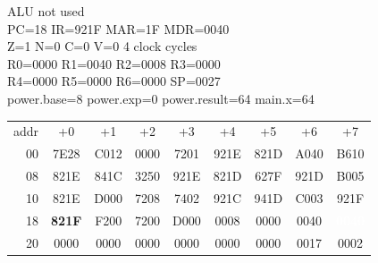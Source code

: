 \begin{tcolorbox}[stepbox, title={Step 37 \hfill PC 17 \quad ST R1, main.x}]
\textcolor{dim}{ALU} \textcolor{dim}{not used}\\
PC=18 IR=921F MAR=1F MDR=0040\\
Z=1 N=0 C=0 V=0 \hfill \textcolor{dim}{4 clock cycles}\\
R0=0000 R1=0040 R2=0008 R3=0000\\
R4=0000 R5=0000 R6=0000 SP=0027\\
\textcolor{dim}{power.base=8  power.exp=0  power.result=64  main.x=64}\\[1pt]
{\setlength{\tabcolsep}{1.6pt}\begin{tabular}{@{}r*{8}{c}@{}}
\textcolor{dim}{addr} & \textcolor{dim}{+0} & \textcolor{dim}{+1} & \textcolor{dim}{+2} & \textcolor{dim}{+3} & \textcolor{dim}{+4} & \textcolor{dim}{+5} & \textcolor{dim}{+6} & \textcolor{dim}{+7}\\
\textcolor{dim}{00} & 7E28 & C012 & 0000 & 7201 & 921E & 821D & A040 & B610\\
\textcolor{dim}{08} & 821E & 841C & 3250 & 921E & 821D & 627F & 921D & B005\\
\textcolor{dim}{10} & 821E & D000 & 7208 & 7402 & 921C & 941D & C003 & 921F\\
\textcolor{dim}{18} & \cellcolor{pcc}\textbf{821F} & F200 & 7200 & D000 & \cellcolor{datac}0008 & \cellcolor{datac}0000 & \cellcolor{datac}0040 & \cellcolor{wrt}\textcolor{white}{\textbf{0040}}\\
\textcolor{dim}{20} & \cellcolor{stackc}0000 & \cellcolor{stackc}0000 & \cellcolor{stackc}0000 & \cellcolor{stackc}0000 & \cellcolor{stackc}0000 & \cellcolor{stackc}0000 & \cellcolor{stackc}0017 & \cellcolor{stackc}0002\\
\end{tabular}}
\end{tcolorbox}\par\vspace{3pt}

